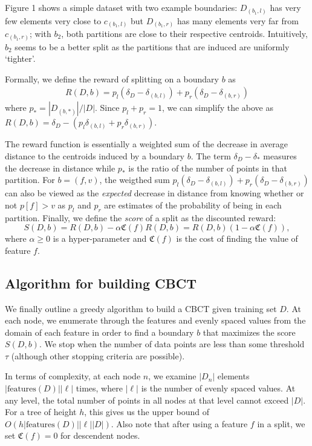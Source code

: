 \documentclass[conference]{IEEEtran}
\begin{document}
Figure 1 shows a simple dataset with two example boundaries: 
$D_{(b_1,l)}$ has very few elements very close to $c_{(b_1,l)}$ but
$D_{(b_1,r)}$ has many elements very far from $c_{(b_1,r)}$; with $b_2$,
both partitions are close to their respective centroids. Intuitively, $b_2$ seems
to be a better split as the partitions that are induced are uniformly `tighter'.

Formally, we define the reward of splitting on a boundary $b$ as
\begin{align*}
	R(D,b) = p_l (\delta_D - \delta_{(b,l)}) + p_r (\delta_D - \delta_{(b,r)})
\end{align*}
where $p_* = |D_{(b,*)} | /  |D|$. Since $p_l + p_r = 1$, we can simplify the
above as $R(D,b) = \delta_D - (p_l \delta_{(b,l)} + p_r \delta_{(b,r)})$.

The reward function is essentially a weighted sum of the decrease in 
average distance to the centroids induced by a boundary $b$. The
term $\delta_D - \delta_*$ measures the decrease in distance while
$p_*$ is the ratio of the number of points in that partition. For 
$b = (f,v)$, the weigthed sum 
$p_l(\delta_D - \delta_{(b,l)}) + p_r (\delta_D -\delta_{(b,r)})$ can
also be viewed as the \emph{expected} decrease in distance from
knowing whether or not $p[f] > v$ as $p_l$ and $p_r$ are estimates of the
probability of being in each partition. Finally, we define the \emph{score}
of a split as the discounted reward:
$$ S(D,b) = R(D,b) - \alpha \mathfrak{C}(f) R(D,b) = 
    R(D,b) (1 - \alpha \mathfrak{C}(f)), $$
 where $\alpha \ge 0$ is a hyper-parameter and $\mathfrak{C}(f)$ is
 the cost of finding the value of feature $f$.
 
 \subsection{Algorithm for building CBCT}
 We finally outline a greedy algorithm to build a CBCT given training set
 $D$. At each node, we enumerate through the features and evenly spaced
 values from the domain of each feature in order to find a boundary 
 $b$ that maximizes the score $S(D,b)$. We stop when the number of data
 points are less than some threshold $\tau$ (although other stopping
 criteria are possible).
 
 In terms of complexity, at each node $n$, we examine $|D_n|$ elements
 $|\text{features}(D)| |\ell|$ times, where $|\ell|$ is the number of
 evenly spaced values. At any level, the total number of points in all nodes
 at that level cannot exceed $|D|$. For a tree of height $h$, this gives us the
 upper bound of $O(h |\text{features}(D)| |\ell| |D| )$. Also note that after
 using a feature $f$ in a split, we set $\mathfrak{C}(f) = 0$ for descendent
 nodes.
\end{document}

